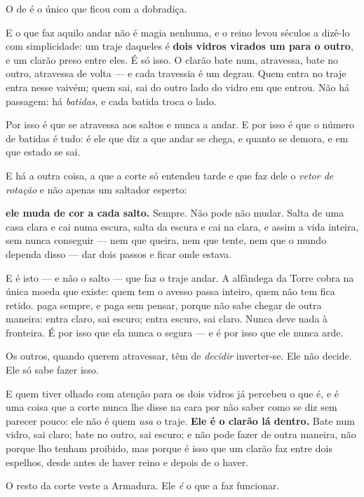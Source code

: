 \documentclass[livro.tex]{subfiles}
\begin{document}
O de \Joa é o único que ficou com a dobradiça.

E o que faz aquilo andar não é magia nenhuma, e o reino levou séculos a dizê-lo com
simplicidade: um traje daqueles é \textbf{dois vidros virados um para o outro}, e um
clarão preso entre eles. É só isso. O clarão bate num, atravessa, bate no outro,
atravessa de volta --- e cada travessia é um degrau. Quem entra no traje entra nesse
vaivém; quem sai, sai do outro lado do vidro em que entrou. Não há passagem: há
\emph{batidas}, e cada batida troca o lado.

Por isso é que se atravessa aos saltos e nunca a andar. E por isso é que o número de
batidas é tudo: é ele que diz a que andar se chega, e quanto se demora, e em que estado
se sai.

\medskip

E há a outra coisa, a que a corte só entendeu tarde e que faz dele o \emph{vetor de
rotação} e não apenas um saltador esperto:

\textbf{ele muda de cor a cada salto.} Sempre. Não pode não mudar. Salta de uma casa
clara e cai numa escura, salta da escura e cai na clara, e assim a vida inteira, sem
nunca conseguir --- nem que queira, nem que tente, nem que o mundo dependa disso --- dar
dois passos e ficar onde estava.

E é isto --- e não o salto --- que faz o traje andar. A alfândega da Torre cobra na única
moeda que existe: quem tem o avesso passa inteiro, quem não tem fica retido. \Joa paga
sempre, e paga sem pensar, porque não sabe chegar de outra maneira: entra claro, sai
escuro; entra escuro, sai claro. Nunca deve nada à fronteira. É por isso que ela nunca o
segura --- e é por isso que ele nunca arde.

Os outros, quando querem atravessar, têm de \emph{decidir} inverter-se. Ele não decide.
Ele só sabe fazer isso.

E quem tiver olhado com atenção para os dois vidros já percebeu o que \Joa é, e é uma
coisa que a corte nunca lhe disse na cara por não saber como se diz sem parecer pouco:
ele não é quem \emph{usa} o traje. \textbf{Ele é o clarão lá dentro.} Bate num vidro,
sai claro; bate no outro, sai escuro; e não pode fazer de outra maneira, não porque lho
tenham proibido, mas porque é isso que um clarão faz entre dois espelhos, desde antes de
haver reino e depois de o haver.

O resto da corte veste a Armadura. Ele \emph{é} o que a faz funcionar.

\medskip
\end{document}
